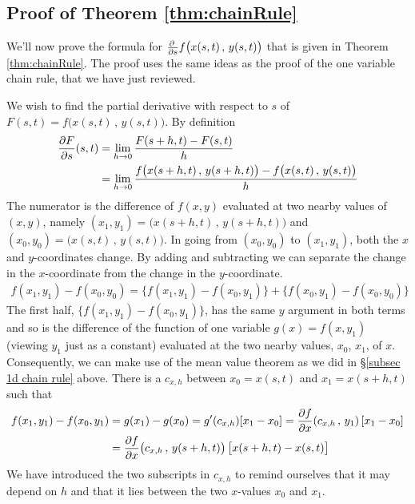 \subsection{Proof of Theorem \ref{thm:chainRule}}
\label{subsec higher d chain rule}

We'll now prove the formula for $\pdiff{}{s} f\big( x(s,t)\,,\,y(s,t)\big)$
that is given in Theorem \ref{thm:chainRule}. The proof uses the same ideas 
as the proof of the one variable chain rule, that we have just reviewed.

We wish to find the partial derivative with respect to $s$ of
$F(s,t)=f\big(x(s,t)\,,\,y(s,t)\big)$. By definition
\begin{align*}
\pdiff{F}{s}(s,t)
&=\lim_{h\rightarrow 0}\frac{F(s+h,t)-F(s,t)}{h}  \\
&=\lim_{h\rightarrow 0}\frac{f\big(x(s+h,t)\,,\,y(s+h,t)\big)
                       -f\big(x(s,t)\,,\,y(s,t)\big)}{h} 
\end{align*}
The numerator is the difference of $f(x,y)$ evaluated at two nearby
values of $(x,y)$, namely $(x_1,y_1)=\big(x(s+h,t)\,,\,y(s+h,t)\big)$ and 
$(x_0,y_0)=\big(x(s,t)\,,\,y(s,t)\big)$. In going from $(x_0,y_0)$
to $(x_1,y_1)$, both the $x$ and $y$-coordinates change. By adding
and subtracting we can separate the change in the $x$-coordinate from the
change in the $y$-coordinate.
\begin{align*}
f(x_1,y_1) - f(x_0,y_0)
=\big\{f(x_1,y_1) - f(x_0,y_1)\big\}  + \big\{f(x_0,y_1) - f(x_0,y_0)\big\}
\end{align*} 
The first half, $\big\{f(x_1,y_1) - f(x_0,y_1)\big\}$, has the same $y$ argument
in both terms and so is the difference of the 
function of one variable $g(x) = f(x,y_1)$ (viewing $y_1$ just as a constant)
evaluated at the two nearby values, $x_0$, $x_1$, of $x$. Consequently, 
we can make use of the mean value theorem as we did in 
\S\ref{subsec 1d chain rule} above. 
There is a $c_{x,h}$ between $x_0=x(s,t)$ and $x_1=x(s+h,t)$ such that
\begin{align*}
f(x_1,y_1) - f(x_0,y_1)
&=g(x_1) - g(x_0)
=g'(c_{x,h}) [x_1-x_0] 
=\pdiff{f}{x}(c_{x,h}\,,\,y_1)\,[x_1-x_0] \\
&=\pdiff{f}{x}\big(c_{x,h}\,,\,y(s+h,t)\big)\,\big[x(s+h,t)-x(s,t)\big]
\end{align*}
We have introduced the two subscripts in $c_{x,h}$ to remind ourselves that
it may depend on $h$ and that it lies between the two $x$-values
$x_0$ and $x_1$.

